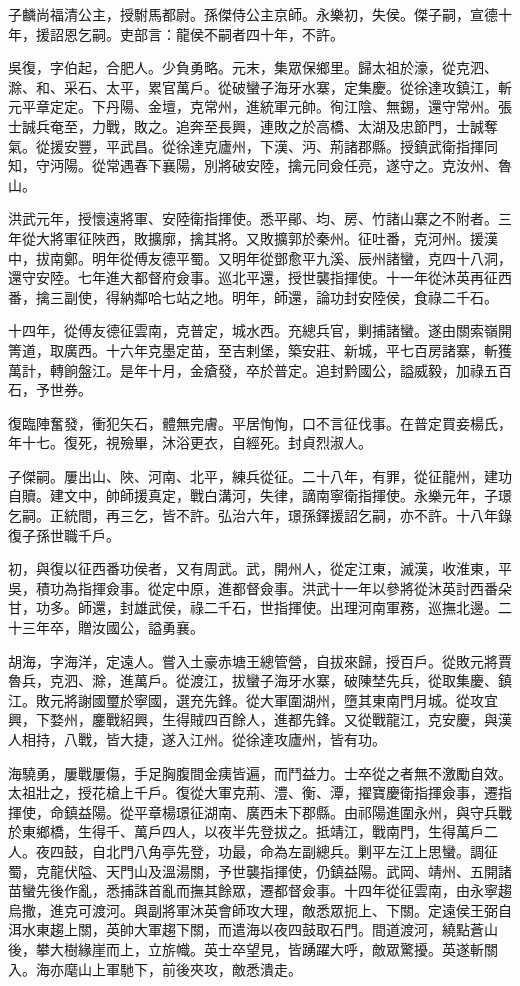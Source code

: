 \begin{pinyinscope}
子麟尚福清公主，授駙馬都尉。孫傑侍公主京師。永樂初，失侯。傑子嗣，宣德十年，援詔恩乞嗣。吏部言：龍侯不嗣者四十年，不許。

吳復，字伯起，合肥人。少負勇略。元末，集眾保鄉里。歸太祖於濠，從克泗、滁、和、采石、太平，累官萬戶。從破蠻子海牙水寨，定集慶。從徐達攻鎮江，斬元平章定定。下丹陽、金壇，克常州，進統軍元帥。徇江陰、無錫，還守常州。張士誠兵奄至，力戰，敗之。追奔至長興，連敗之於高橋、太湖及忠節門，士誠奪氣。從援安豐，平武昌。從徐達克廬州，下漢、沔、荊諸郡縣。授鎮武衛指揮同知，守沔陽。從常遇春下襄陽，別將破安陸，擒元同僉任亮，遂守之。克汝州、魯山。

洪武元年，授懷遠將軍、安陸衛指揮使。悉平鄖、均、房、竹諸山寨之不附者。三年從大將軍征陜西，敗擴廓，擒其將。又敗擴郭於秦州。征吐番，克河州。援漢中，拔南鄭。明年從傅友德平蜀。又明年從鄧愈平九溪、辰州諸蠻，克四十八洞，還守安陸。七年進大都督府僉事。巡北平還，授世襲指揮使。十一年從沐英再征西番，擒三副使，得納鄰哈七站之地。明年，師還，論功封安陸侯，食祿二千石。

十四年，從傅友德征雲南，克普定，城水西。充總兵官，剿捕諸蠻。遂由關索嶺開箐道，取廣西。十六年克墨定苗，至吉剌堡，築安莊、新城，平七百房諸寨，斬獲萬計，轉餉盤江。是年十月，金瘡發，卒於普定。追封黔國公，謚威毅，加祿五百石，予世券。

復臨陣奮發，衝犯矢石，體無完膚。平居恂恂，口不言征伐事。在普定買妾楊氏，年十七。復死，視殮畢，沐浴更衣，自經死。封貞烈淑人。

子傑嗣。屢出山、陜、河南、北平，練兵從征。二十八年，有罪，從征龍州，建功自贖。建文中，帥師援真定，戰白溝河，失律，謫南寧衛指揮使。永樂元年，子璟乞嗣。正統間，再三乞，皆不許。弘治六年，璟孫鐸援詔乞嗣，亦不許。十八年錄復子孫世職千戶。

初，與復以征西番功侯者，又有周武。武，開州人，從定江東，滅漢，收淮東，平吳，積功為指揮僉事。從定中原，進都督僉事。洪武十一年以參將從沐英討西番朵甘，功多。師還，封雄武侯，祿二千石，世指揮使。出理河南軍務，巡撫北邊。二十三年卒，贈汝國公，謚勇襄。

胡海，字海洋，定遠人。嘗入土豪赤塘王總管營，自拔來歸，授百戶。從敗元將賈魯兵，克泗、滁，進萬戶。從渡江，拔蠻子海牙水寨，破陳埜先兵，從取集慶、鎮江。敗元將謝國璽於寧國，選充先鋒。從大軍圍湖州，墮其東南門月城。從攻宜興，下婺州，鏖戰紹興，生得賊四百餘人，進都先鋒。又從戰龍江，克安慶，與漢人相持，八戰，皆大捷，遂入江州。從徐達攻廬州，皆有功。

海驍勇，屢戰屢傷，手足胸腹間金痍皆遍，而鬥益力。士卒從之者無不激勵自效。太祖壯之，授花槍上千戶。復從大軍克荊、澧、衡、潭，擢寶慶衛指揮僉事，遷指揮使，命鎮益陽。從平章楊璟征湖南、廣西未下郡縣。由祁陽進圍永州，與守兵戰於東鄉橋，生得千、萬戶四人，以夜半先登拔之。抵靖江，戰南門，生得萬戶二人。夜四鼓，自北門八角亭先登，功最，命為左副總兵。剿平左江上思蠻。調征蜀，克龍伏隘、天門山及溫湯關，予世襲指揮使，仍鎮益陽。武岡、靖州、五開諸苗蠻先後作亂，悉捕誅首亂而撫其餘眾，遷都督僉事。十四年從征雲南，由永寧趨烏撒，進克可渡河。與副將軍沐英會師攻大理，敵悉眾扼上、下關。定遠侯王弼自洱水東趨上關，英帥大軍趨下關，而遣海以夜四鼓取石門。間道渡河，繞點蒼山後，攀大樹緣崖而上，立旂幟。英士卒望見，皆踴躍大呼，敵眾驚擾。英遂斬關入。海亦麾山上軍馳下，前後夾攻，敵悉潰走。


\end{pinyinscope}
